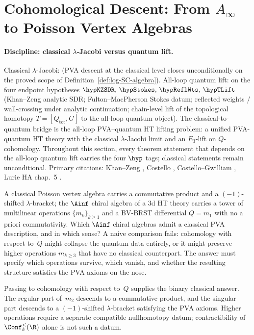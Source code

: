 \section{Cohomological Descent: From $A_\infty$ to Poisson Vertex Algebras}

\paragraph{Discipline: classical $\lambda$-Jacobi versus quantum lift.}
Classical $\lambda$-Jacobi: \ClaimStatusProvedHere{} (PVA descent at the
classical level closes unconditionally on the proved scope of
Definition~\ref{def:log-SC-algebra}). All-loop quantum lift:
\ClaimStatusConditional{} on the four endpoint hypotheses
$\hypKZSDR,\,\hypStokes,\,\hypReflWts,\,\hypTLift$
(Khan--Zeng analytic SDR; Fulton--MacPherson Stokes datum;
reflected weights / wall-crossing under analytic continuation;
chain-level lift of the topological homotopy
$T = [Q_{\mathrm{tot}}, G]$ to the all-loop quantum object).
The classical-to-quantum bridge is
the all-loop PVA--quantum HT lifting problem: a unified PVA-quantum
HT theory with the classical $\lambda$-Jacobi limit and an
$E_3$-lift on $Q$-cohomology. Throughout this section, every theorem statement that
depends on the all-loop quantum lift carries the four $\hyp$ tags;
classical statements remain unconditional. Primary citations:
Khan--Zeng \cite{KZ25}, Costello \cite{Costello2011Renorm},
Costello--Gwilliam \cite{CG17}, Lurie HA chap.~5 \cite{LurieHA}.

A classical Poisson vertex algebra carries a commutative product
and a $(-1)$-shifted $\lambda$-bracket; the $\Ainf$ chiral
algebra of a 3d HT theory carries a tower of multilinear
operations $\{m_k\}_{k \ge 1}$ and a BV-BRST differential
$Q = m_1$ with no a priori commutativity. Which $\Ainf$ chiral
algebras admit a classical PVA description, and in which sense?
A naive comparison fails: cohomology with respect to~$Q$ might
collapse the quantum data entirely, or it might preserve higher
operations $m_{k \ge 3}$ that have no classical counterpart.
The answer must specify which operations survive, which
vanish, and whether the resulting structure satisfies the PVA
axioms on the nose.

Passing to cohomology with respect to~$Q$ supplies the binary
classical answer. The regular part of~$m_2$ descends to a
commutative product, and the singular part descends to a
$(-1)$-shifted $\lambda$-bracket satisfying the PVA axioms.
Higher operations require a separate compatible nullhomotopy datum;
contractibility of $\Conf_k^{<}(\R)$ alone is not such a datum.

